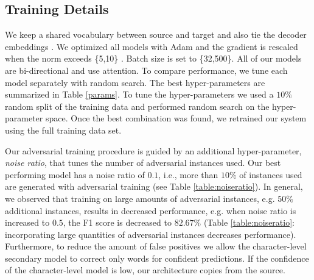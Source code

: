\documentclass[letterpaper]{article} \usepackage{aaai19}  \usepackage{times}  \usepackage{helvet} \usepackage{courier}  \usepackage[hyphens]{url}  \usepackage{graphicx} \urlstyle{rm} \def\UrlFont{\rm}  \usepackage{graphicx}  \frenchspacing  \setlength{\pdfpagewidth}{8.5in}  \setlength{\pdfpageheight}{11in}
\newcommand{\citep}{\cite}
\begin{document}
\subsection{Training Details} 
We keep a shared vocabulary between source and target and also tie the decoder embeddings \citep{press2017using}. We optimized all models with Adam \citep{kingma2014adam} and the gradient is rescaled when the norm exceeds \{5,10\} \citep{pascanu2013difficulty}. Batch size is set to \{32,500\}. All of our models are bi-directional and use attention. To compare performance, we tune each model separately with random search. The best hyper-parameters are summarized in Table \ref{params}. To tune the hyper-parameters we used a $10\%$ random split of the training data and performed random search on the hyper-parameter space. Once the best combination was found, we retrained our system using the full training data set. 

Our adversarial training procedure is guided by an additional hyper-parameter, \textit{noise ratio}, that tunes the number of adversarial instances used. Our best performing model has a noise ratio of $0.1$, i.e., more than $10\%$ of instances used are generated with adversarial training (see Table \ref{table:noiseratio}). In general, we observed that training on large amounts of adversarial instances, e.g. $50\%$ additional instances, results in decreased performance, e.g. when noise ratio is increased to $0.5$, the F1 score is decreased to $82.67\%$ (Table \ref{table:noiseratio}: incorporating large quantities of adversarial instances decreases performance). Furthermore, to reduce the amount of false positives we allow the character-level secondary model to correct only words for confident predictions. If the confidence of the character-level model is low, our architecture copies from the source.

\begin{table}[h]
\centering
{}
\caption{Best performing hyper-parameter settings of our proposed text normalization models}
\label{params}
\end{table}
\end{document}
